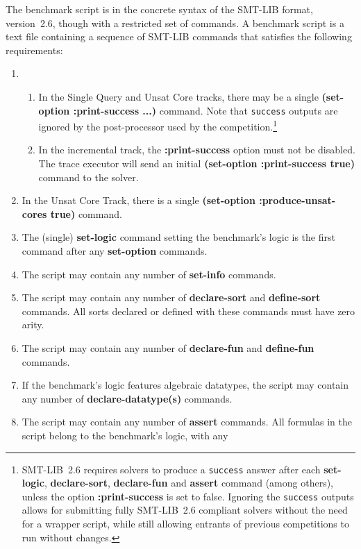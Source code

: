 \documentclass[12pt]{article}
\newcommand{\akey}[1]{\textbf{#1}}
\newcommand{\main}{Single Query\xspace}
\newcommand{\ucore}{Unsat Core\xspace}
\begin{document}
The benchmark script is in the concrete syntax of the SMT-LIB format,
version~2.6, though with a restricted set of commands.  A benchmark
script is a text file containing a sequence of SMT-LIB commands that
satisfies the following requirements:
%
\begin{enumerate}
\item
  \begin{enumerate}
  \item In the \main and \ucore tracks, there may be a single
    \akey{(set-option :print-success ...)} command.  Note that
    \texttt{success} outputs are ignored by the post-processor used by
    the competition.\footnote{SMT-LIB~2.6 requires solvers to produce
      a \texttt{success} answer after each \akey{set-logic},
      \akey{declare-sort}, \akey{declare-fun} and \akey{assert}
      command (among others), unless the option \akey{:print-success}
      is set to false.  Ignoring the \texttt{success} outputs allows
      for submitting fully SMT-LIB~2.6 compliant solvers without the
      need for a wrapper script, while still allowing entrants of
      previous competitions to run without changes.}
  \item In the incremental track, the \akey{:print-success} option
    must not be disabled.  The trace executor will send an initial
      \akey{(set-option :print-success true)} command to the solver.
  \end{enumerate}
\item In the \ucore Track, there is a single \akey{(set-option
  :produce-unsat-cores true)} command.
\item The (single) \akey{set-logic} command setting the benchmark's
  logic is the first command after any \akey{set-option} commands.
\item The script may contain any number of \akey{set-info} commands.
\item The script may contain any number of \akey{declare-sort} and
  \akey{define-sort} commands.  All sorts declared or defined with
  these commands must have zero arity.
\item The script may contain any number of \akey{declare-fun} and
  \akey{define-fun} commands.
\item If the benchmark's logic features algebraic datatypes, the
  script may contain any number of \akey{declare-datatype(s)}
  commands.
\item The script may contain any number of \akey{assert} commands.
  All formulas in the script belong to the benchmark's logic, with any

\end{enumerate}
\end{document}
